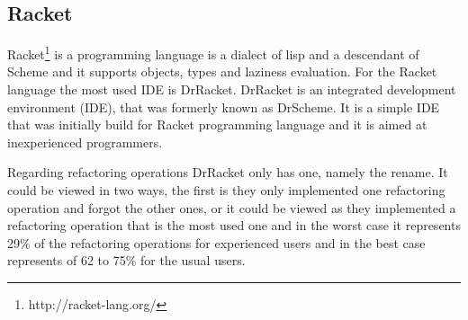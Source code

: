 \subsection{Racket}

Racket\footnote{http://racket-lang.org/} is a programming language is a dialect of lisp and a descendant of Scheme and it supports objects, types and laziness evaluation.
For the Racket language the most used IDE is DrRacket. DrRacket is an integrated development environment (IDE), that was formerly known as DrScheme. 
It is a simple IDE that was initially build for Racket programming language and it is aimed at inexperienced programmers.

Regarding refactoring operations DrRacket only has one, namely the rename. 
It could be viewed in two ways, the first is they only implemented one refactoring operation and forgot the other ones, or it could be viewed as they implemented a refactoring operation that is the most used one and in the worst case it represents 29\% of the refactoring operations for experienced users and in the best case represents of 62 to 75\% for the usual users. 